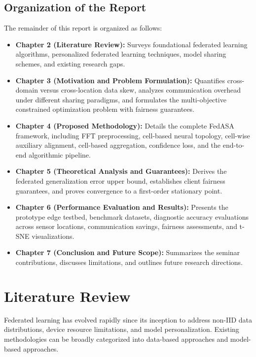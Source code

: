 \documentclass[12pt,a4paper]{report}
\begin{document}
\section{Organization of the Report}
The remainder of this report is organized as follows:
\begin{itemize}
    \item \textbf{Chapter 2 (Literature Review):} Surveys foundational federated learning algorithms, personalized federated learning techniques, model sharing schemes, and existing research gaps.
    \item \textbf{Chapter 3 (Motivation and Problem Formulation):} Quantifies cross-domain versus cross-location data skew, analyzes communication overhead under different sharing paradigms, and formulates the multi-objective constrained optimization problem with fairness guarantees.
    \item \textbf{Chapter 4 (Proposed Methodology):} Details the complete FedASA framework, including FFT preprocessing, cell-based neural topology, cell-wise auxiliary alignment, cell-based aggregation, confidence loss, and the end-to-end algorithmic pipeline.
    \item \textbf{Chapter 5 (Theoretical Analysis and Guarantees):} Derives the federated generalization error upper bound, establishes client fairness guarantees, and proves convergence to a first-order stationary point.
    \item \textbf{Chapter 6 (Performance Evaluation and Results):} Presents the prototype edge testbed, benchmark datasets, diagnostic accuracy evaluations across sensor locations, communication savings, fairness assessments, and t-SNE visualizations.
    \item \textbf{Chapter 7 (Conclusion and Future Scope):} Summarizes the seminar contributions, discusses limitations, and outlines future research directions.
\end{itemize}


\chapter{Literature Review}

Federated learning has evolved rapidly since its inception to address non-IID data distributions, device resource limitations, and model personalization. Existing methodologies can be broadly categorized into data-based approaches and model-based approaches.
\end{document}
